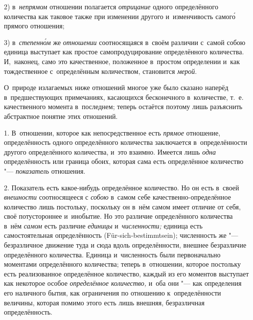 2) в~{\em непрямом} отношении полагается {\em отрицание} одного определённого
количества как таковое также при изменении другого и~изменчивость самог\'{о}
прямого отношения;

3) в~{\em степенн\'{о}м} же {\em отношении} соотносящаяся в~своём различии
с~самой собою единица выступает как простое самопродуцирование определённого
количества. И,~наконец, само это качественное, положенное в~простом определении
и~как тождественное с~определённым количеством, становится {\em мерой}.

О~природе излагаемых ниже отношений многое уже было сказано наперёд
в~предшествующих примечаниях, касающихся бесконечного в~количестве, т.~е.
качественного момента в~последнем; теперь остаётся поэтому лишь разъяснить
абстрактное понятие этих отношений.


1. В~отношении, которое как непосредственное есть {\em прямое} отношение,
определённость одного определённого количества заключается в~определённости
другого определённого количества, и~это взаимно. Имеется лишь {\em одна}
определённость или граница обоих, которая сама есть определённое количество
"--- {\em показатель} отношения.

2. Показатель есть какое-нибудь определённое количество. Но он есть в~своей
{\em внешности} соотносящееся с {\em собою} в~самом себе
качественно-определённое количество лишь постольку, поскольку он в~нём самом
имеет отличие от себя, своё потустороннее и~инобытие. Но это различие
определённого количества в~нём {\em самом} есть различие {\em единицы}
и~{\em численности;} единица есть самостоятельная определённость
(Für-sich-bestimmt\-sein); численность же "--- безразличное движение туда и
сюда вдоль определённости, внешнее безразличие определённого количества.
Единица и~численность были первоначально моментами определённого количества;
теперь в~отношении, которое постольку есть реализованное определённое
количество, каждый из его моментов выступает как некоторое особое
{\em определённое количество,} и~оба они "--- как определения его наличного
бытия, как ограничения по отношению к~определённости величины, которая помимо
этого есть лишь внешняя, безразличная определённость.

